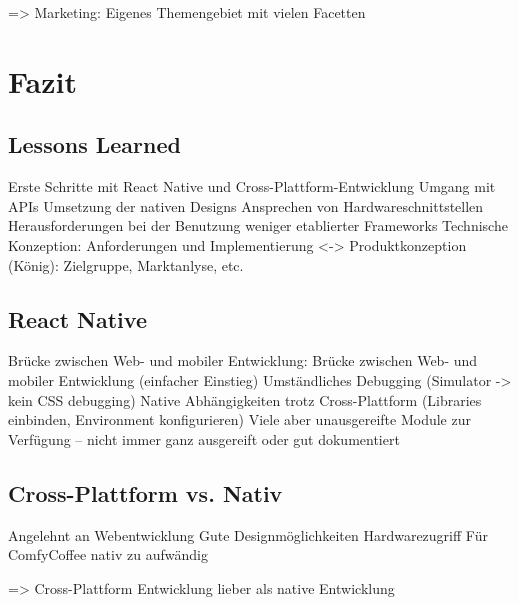 => Marketing: Eigenes Themengebiet mit vielen Facetten






\chapter{Fazit}
\label{fazit}


\section{Lessons Learned}
Erste Schritte mit React Native und Cross-Plattform-Entwicklung
Umgang mit APIs
Umsetzung der nativen Designs
Ansprechen von Hardwareschnittstellen
Herausforderungen bei der Benutzung weniger etablierter Frameworks
Technische Konzeption: Anforderungen und Implementierung <-> Produktkonzeption (König): Zielgruppe, Marktanlyse, etc.




\section{React Native}
Brücke zwischen Web- und mobiler Entwicklung: Brücke zwischen Web- und mobiler Entwicklung (einfacher Einstieg)
Umständliches Debugging (Simulator -> kein CSS debugging)
Native Abhängigkeiten trotz Cross-Plattform (Libraries einbinden, Environment konfigurieren)
Viele aber unausgereifte Module zur Verfügung – nicht immer ganz ausgereift oder gut dokumentiert


\section{Cross-Plattform vs. Nativ}
Angelehnt an Webentwicklung
Gute Designmöglichkeiten
Hardwarezugriff
Für ComfyCoffee nativ zu aufwändig

=> Cross-Plattform Entwicklung lieber als native Entwicklung